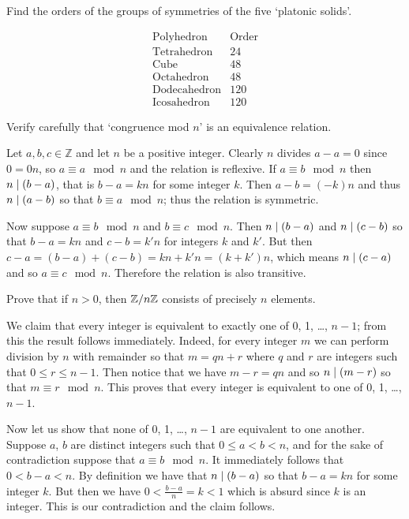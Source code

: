\begin{exercise}
	Find the orders of the groups of symmetries of the five `platonic solids'.
\end{exercise}
\begin{solution}
	{%
		\renewcommand{\arraystretch}{1.5}
	\[
		\begin{array}{c|c}
			\text{Polyhedron} & \text{Order}\\
			\hline
			\hline
			\text{Tetrahedron} & 24 \\
			\hline
			\text{Cube} & 48\\
			\hline
			\text{Octahedron} & 48\\
			\hline
			\text{Dodecahedron} & 120 \\
			\hline
			\text{Icosahedron} & 120
		\end{array}
	\]
	}
\end{solution}

\begin{exercise}
	Verify carefully that `congruence mod $n$' is an equivalence relation.
\end{exercise}
\begin{solution}
	Let $a,b,c\in \mathbb{Z}$ and let $n$ be a positive integer. Clearly $n$ divides $a-a = 0$ since $0 = 0n$, so $a\equiv a \mod n$ and the relation is reflexive. If $a\equiv b \mod n$ then $n\mid (b-a)$, that is $b-a = kn$ for some integer $k$. Then $a-b = (-k)n$ and thus $n\mid(a-b)$ so that $b\equiv a\mod n$; thus the relation is symmetric.
	
	Now suppose $a\equiv b \mod n$ and $b \equiv c \mod n$. Then $n\mid(b-a)$ and $n\mid (c - b)$ so that $b-a = kn$ and $c-b = k'n$ for integers $k$ and $k'$. But then $c - a = (b-a) + (c-b)  = kn + k'n = (k+k')n$, which means $n\mid (c-a)$ and so $a \equiv c \mod n$. Therefore the relation is also transitive.
\end{solution}

\begin{exercise}
	Prove that if $n>0$, then $\mathbb{Z}/n\mathbb{Z}$ consists of precisely $n$ elements.
\end{exercise}
\begin{solution}
	We claim that every integer is equivalent to exactly one of $0$, 1, \ldots, $n-1$; from this the result follows immediately. Indeed, for every integer $m$ we can perform division by $n$ with remainder so that $m = qn + r$ where $q$ and $r$ are integers such that $0\leq r \leq n - 1$. Then notice that we have $m - r  = qn$ and so $n\mid (m-r)$ so that $m\equiv r \mod n$. This proves that every integer is equivalent to one of $0$, 1, \ldots, $n-1$.
	
	Now let us show that none of $0$, 1, \ldots, $n-1$ are equivalent to one another. Suppose $a$, $b$ are distinct integers such that $0\leq a<b<n$, and for the sake of contradiction suppose that $a\equiv b \mod n$. It immediately follows that $0< b-a < n$. By definition we have that $n\mid (b-a)$ so that $b-a = kn$ for some integer $k$. But then we have $0< \frac{b-a}{n} = k < 1$ which is absurd since $k$ is an integer. This is our contradiction and the claim follows.
\end{solution}

